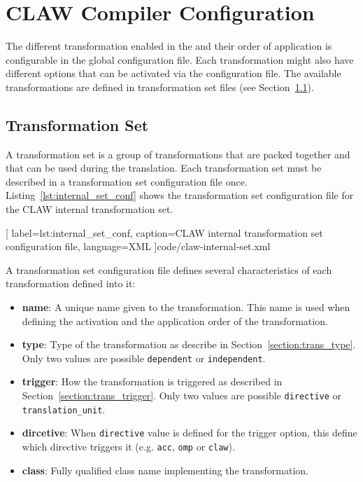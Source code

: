 \chapter{CLAW Compiler Configuration}
\label{chapter:configuration}

The different transformation enabled in the \clawfcomp and their order of 
application is configurable in the \clawfcomp global configuration file. Each
transformation might also have different options that can be activated via the
configuration file. The available transformations are defined in transformation 
set files (see Section~\ref{section:conf_trans_set}).

\section{Transformation Set}
\label{section:conf_trans_set}
A transformation set is a group of transformations that are packed together and
that can be used during the translation. Each transformation set must be
described in a transformation set configuration file once. 
Listing~\ref{lst:internal_set_conf} shows the transformation set
configuration file for the CLAW internal transformation set.


  [
    label=lst:internal_set_conf,
    caption=CLAW internal transformation set configuration file,
    language=XML
  ]{code/claw-internal-set.xml}

A transformation set configuration file defines several characteristics of each
transformation defined into it:
\begin{itemize}
  \item \textbf{name}: A unique name given to the transformation. This name is 
        used when defining the activation and the application order of the 
        transformation.
  \item \textbf{type}: Type of the transformation as describe in 
        Section~\ref{section:trans_type}. Only two values are possible
        \lstinline|dependent| or \lstinline|independent|.
  \item \textbf{trigger}: How the transformation is triggered as described in 
        Section~\ref{section:trans_trigger}. Only two values are possible
        \lstinline|directive| or \lstinline|translation_unit|.
  \item \textbf{dircetive}: When \lstinline|directive| value is defined for the
        trigger option, this define which directive triggers it (e.g. 
        \lstinline|acc|, \lstinline|omp| or \lstinline|claw|). 
  \item \textbf{class}: Fully qualified class name implementing the 
        transformation.
\end{itemize}

